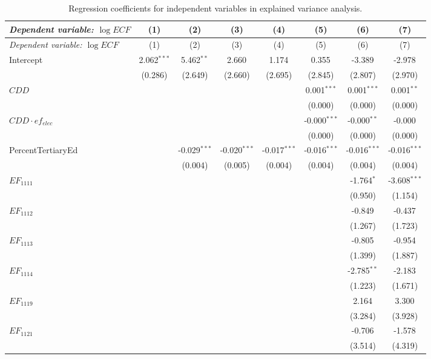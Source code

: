 \begin{longtable}[h]{lccccccc} 
\caption{Regression coefficients for independent variables in explained variance analysis.}\label{stepwise_coefs} \\
 \toprule
 \textit{Dependent variable: $\log ECF$} & (1) & (2) & (3) & (4) & (5) & (6) & (7)\\
 \midrule
 \endfirsthead
 \toprule
 \textit{Dependent variable: $\log ECF$} & (1) & (2) & (3) & (4) & (5) & (6) & (7) \\
 \midrule
 \endhead
Intercept & 2.062$^{***}$ & 5.462$^{**}$ & 2.660$^{}$ & 1.174$^{}$ & 0.355$^{}$ & -3.389$^{}$ & -2.978$^{}$ \\
  & (0.286) & (2.649) & (2.660) & (2.695) & (2.845) & (2.807) & (2.970) \\
    $CDD$ & & & & & 0.001$^{***}$ & 0.001$^{***}$ & 0.001$^{**}$ \\
  & & & & & (0.000) & (0.000) & (0.000) \\
 $CDD \cdot ef_{elec}$ & & & & & -0.000$^{***}$ & -0.000$^{**}$ & -0.000$^{}$ \\
  & & & & & (0.000) & (0.000) & (0.000) \\
 PercentTertiaryEd & & -0.029$^{***}$ & -0.020$^{***}$ & -0.017$^{***}$ & -0.016$^{***}$ & -0.016$^{***}$ & -0.016$^{***}$ \\
  & & (0.004) & (0.005) & (0.004) & (0.004) & (0.004) & (0.004) \\
 $EF_{1111}$ & & & & & & -1.764$^{*}$ & -3.608$^{***}$ \\
  & & & & & & (0.950) & (1.154) \\

 $EF_{1112}$ & & & & & & -0.849$^{}$ & -0.437$^{}$ \\
  & & & & & & (1.267) & (1.723) \\

 $EF_{1113}$ & & & & & & -0.805$^{}$ & -0.954$^{}$ \\
  & & & & & & (1.399) & (1.887) \\

 $EF_{1114}$ & & & & & & -2.785$^{**}$ & -2.183$^{}$ \\
  & & & & & & (1.223) & (1.671) \\

 $EF_{1119}$ & & & & & & 2.164$^{}$ & 3.300$^{}$ \\
  & & & & & & (3.284) & (3.928) \\

 $EF_{1121}$ & & & & & & -0.706$^{}$ & -1.578$^{}$ \\
  & & & & & & (3.514) & (4.319) \\


\end{longtable}
